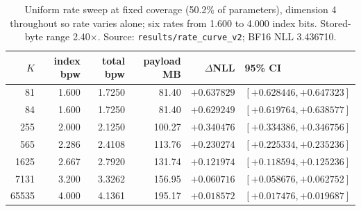 \begin{table}[t]
\centering
\small
\begin{tabular}{rrrrrl}
\toprule
$K$ & index bpw & total bpw & payload MB & $\Delta$NLL & 95\% CI \\
\midrule
81 & 1.600 & 1.7250 & 81.40 & $+0.637829$ & $[+0.628446, +0.647323]$ \\
84 & 1.600 & 1.7250 & 81.40 & $+0.629249$ & $[+0.619764, +0.638577]$ \\
255 & 2.000 & 2.1250 & 100.27 & $+0.340476$ & $[+0.334386, +0.346756]$ \\
565 & 2.286 & 2.4108 & 113.76 & $+0.230274$ & $[+0.225334, +0.235236]$ \\
1625 & 2.667 & 2.7920 & 131.74 & $+0.121974$ & $[+0.118594, +0.125236]$ \\
7131 & 3.200 & 3.3262 & 156.95 & $+0.060716$ & $[+0.058676, +0.062752]$ \\
65535 & 4.000 & 4.1361 & 195.17 & $+0.018572$ & $[+0.017476, +0.019687]$ \\
\bottomrule
\end{tabular}
\caption{Uniform rate sweep at fixed coverage (50.2\% of parameters), dimension 4 throughout so rate varies alone; six rates from 1.600 to 4.000 index bits. Stored-byte range 2.40$\times$. Source: \texttt{results/rate\_curve\_v2}; BF16 NLL 3.436710.}
\label{tab:rate}
\end{table}
